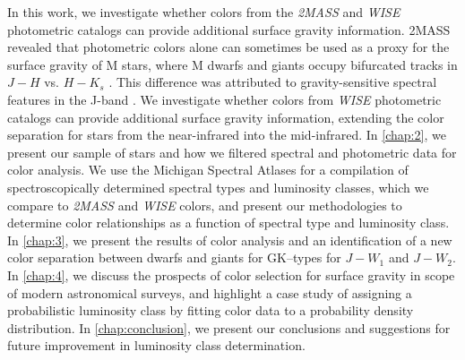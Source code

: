In this work, we investigate whether colors from the \textit{2MASS} and \textit{WISE} photometric catalogs can provide additional surface gravity information. 2MASS revealed that photometric colors alone can sometimes be used as a proxy for the surface gravity of M stars, where M dwarfs and giants occupy bifurcated tracks in $J-H$ vs. $H-K_s$ \citep[Roc Cutri, 
priv. comm.,][]{Bessell1988,Carpenter2001,Ciardi2011,Plavchan2008,Plavchan2006,Skrutskie2006}. This difference was attributed to gravity-sensitive spectral features in the J-band \citep[]{Bessell1988}. We investigate whether colors from \textit{WISE} photometric catalogs can provide additional surface gravity information, extending the color separation for stars from the near-infrared into the mid-infrared. In \autoref{chap:2}, we present our sample of stars and how we filtered spectral and photometric data for color analysis. We use the Michigan Spectral Atlases for a compilation of spectroscopically determined spectral types and luminosity classes, which we compare to \textit{2MASS} and \textit{WISE} colors, and present our methodologies to determine color relationships as a function of spectral type and luminosity class.  In \autoref{chap:3}, we present the results of color analysis and an identification of a new color separation between dwarfs and giants for GK--types for $J-W_{1}$ and  $J-W_{2}$. In \autoref{chap:4}, we discuss the prospects of color selection for surface gravity in scope of modern astronomical surveys, and highlight a case study of assigning a probabilistic luminosity class by fitting color data to a probability density distribution. In \autoref{chap:conclusion}, we present our conclusions and suggestions for future improvement in luminosity class determination.




